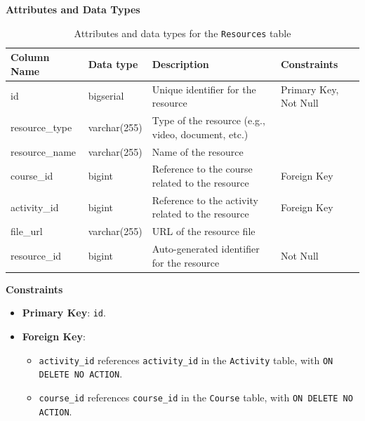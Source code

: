 \documentclass[12pt]{article}
\begin{document}
\textbf{Attributes and Data Types}
\begin{table}[H]
    \centering
    \renewcommand{\arraystretch}{1.5}
    \begin{tabular}{|l|l|p{4.5cm}|l|}
    \hline
    \rowcolor[HTML]{96FFFB} 
    \textbf{Column Name} & \textbf{Data type}        & \textbf{Description}                                   & \textbf{Constraints}             \\ \hline
    id                   & bigserial               & Unique identifier for the resource                     & Primary Key, Not Null            \\ \hline
    resource\_type       & varchar(255)            & Type of the resource (e.g., video, document, etc.)     &                                 \\ \hline
    resource\_name       & varchar(255)            & Name of the resource                                   &                                 \\ \hline
    course\_id           & bigint                  & Reference to the course related to the resource        & Foreign Key                      \\ \hline
    activity\_id         & bigint                  & Reference to the activity related to the resource      & Foreign Key                      \\ \hline
    file\_url            & varchar(255)            & URL of the resource file                               &                                 \\ \hline
    resource\_id         & bigint                  & Auto-generated identifier for the resource             & Not Null                         \\ \hline
    \end{tabular}
    \caption{Attributes and data types for the \texttt{Resources} table}
\end{table}

\noindent
\textbf{Constraints}
\begin{itemize}
    \item \textbf{Primary Key}: \texttt{id}.
    \item \textbf{Foreign Key}: 
    \begin{itemize}
        \item \texttt{activity\_id} references \texttt{activity\_id} in the \texttt{Activity} table, with \texttt{ON DELETE NO ACTION}.
        \item \texttt{course\_id} references \texttt{course\_id} in the \texttt{Course} table, with \texttt{ON DELETE NO ACTION}.
    \end{itemize}
\end{itemize}
\end{document}
